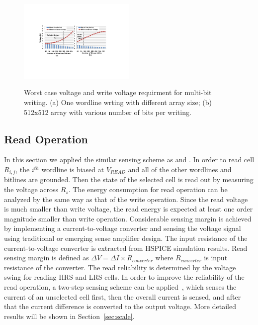 \begin{figure}%
\centering\label{fig:multiV}
  \includegraphics[width=0.5\textwidth]{./figures/multi_V.pdf}\\
  \caption{Worst case voltage and write voltage requirment for multi-bit writing. (a) One wordline wrting with different array size; (b) 512x512 array with various number of bits per writing.}\label{fig:reliable_region}
    \vspace{-10pt}
\end{figure}
\subsection{Read Operation}
In this section we applied the similar sensing scheme as
\cite{crossbar_TED_2010} and \cite{crossbar_NANO08_Flocke}. In order to
read cell $R_{i,j}$, the $i^{th}$ wordline is biased at $V_{READ}$ and all
of the other wordlines and bitlines are grounded. Then the state of the
selected cell is read out by measuring the voltage across $R_s$. The
energy consumption for read operation can be analyzed by the same way as
that of the write operation. Since the read voltage is much smaller than
write voltage, the read energy is expected at least one order magnitude smaller than
write operation. Considerable sensing margin is achieved by implementing a
current-to-voltage converter and sensing the voltage signal using
traditional or emerging sense amplifier design. The input resistance of
the current-to-voltage converter is extracted from HSPICE simulation
results. Read sensing margin is defined as $\Delta V = \Delta I \times
R_{converter}$ where $R_{converter}$ is input resistance of the converter. The read reliability
is determined by the voltage swing for reading HRS and LRS cells. In order to improve the reliability of the read
operation, a two-step sensing scheme can be applied~\cite{memristor:Cong}, which senses the current of an unselected cell first, then the overall current is sensed, and after that the current difference is converted to the output voltage. More detailed results will be shown in Section~\ref{sec:scale}.

